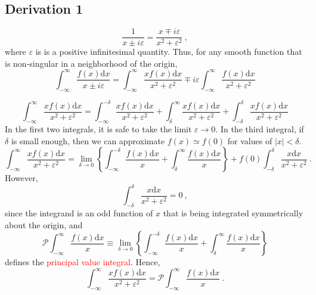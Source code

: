 \documentclass[11pt,a4paper]{article}
\newcommand{\dif}{\mathrm{d}}
\begin{document}
\subsection{Derivation 1}
\begin{equation}
\dfrac{1}{x \pm i\varepsilon} = \dfrac{x\mp i \varepsilon}{x^2 +\varepsilon^2} ~,
\end{equation}
where $\varepsilon$ is is a positive infinitesimal quantity. Thus, for any smooth function that is non-singular in a neighborhood of the origin,
\begin{equation}
\int_{-\infty}^\infty \dfrac{f(x) \dif x}{x \pm i\varepsilon} = \int_{-\infty}^\infty \dfrac{ x f(x) \dif x}{x^2 +\varepsilon^2} \mp i \varepsilon \int_{-\infty}^\infty \dfrac{ f(x) \dif x}{x^2 +\varepsilon^2} 
\end{equation}

\begin{equation}
\int_{-\infty}^\infty \dfrac{ x f(x) \dif x}{x^2 +\varepsilon^2} = \int_{-\infty}^{-\delta} \dfrac{ x f(x) \dif x}{x^2 +\varepsilon^2} + \int_{\delta}^{\infty} \dfrac{ x f(x) \dif x}{x^2 +\varepsilon^2} +  \int_{-\delta}^{\delta} \dfrac{ x f(x) \dif x}{x^2 +\varepsilon^2}
\end{equation}
In the first two integrals, it is safe to take the limit $\varepsilon \rightarrow 0$. In the third integral, if $\delta$ is small enough, then we can approximate $f(x) \simeq f(0)$ for values of $|x| < \delta$. 
\begin{equation}
\int_{-\infty}^\infty \dfrac{ x f(x) \dif x}{x^2 +\varepsilon^2} = \lim_{\delta \rightarrow 0} \left\{ \int_{-\infty}^{-\delta} \dfrac{f(x) \dif x}{x} + \int_{\delta}^{\infty} \dfrac{f(x) \dif x}{x} \right\} + f(0) \int_{-\delta}^{\delta} \dfrac{ x \dif x}{x^2 +\varepsilon^2} ~.
\end{equation}
However, 
\begin{equation}
\int_{-\delta}^{\delta} \dfrac{ x \dif x}{x^2 +\varepsilon^2} = 0 ~,
\end{equation}
since the integrand is an odd function of $x$ that is being integrated symmetrically about the origin, and
\begin{equation}
{\mathcal P} \int_{-\infty}^\infty \dfrac{f(x) \dif x}{x} \equiv \lim_{\delta \rightarrow 0} \left\{ \int_{-\infty}^{-\delta} \dfrac{f(x) \dif x}{x} + \int_{\delta}^{\infty} \dfrac{f(x) \dif x}{x} \right\} 
\end{equation}
defines the \textcolor{red}{principal value integral}. Hence,
\begin{equation}
\int_{-\infty}^\infty \dfrac{ x f(x) \dif x}{x^2 +\varepsilon^2} = {\mathcal P} \int_{-\infty}^\infty \dfrac{f(x) \dif x}{x} ~.
\end{equation}
\end{document}
